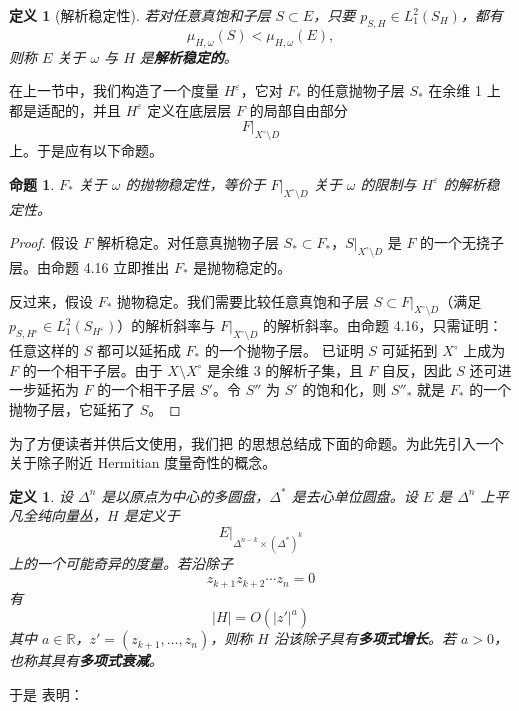 \documentclass[12pt,a4paper]{article}
\newtheorem{proposition}[theorem]{命题}
\newtheorem{definition}[theorem]{定义}
\begin{document}
\begin{definition}[解析稳定性]
若对任意真饱和子层 \(S\subset E\)，只要 \(p_{S,H}\in L_1^2(S_H)\)，都有
\[
\mu_{H,\omega}(S)<\mu_{H,\omega}(E),
\]
则称 \(E\) 关于 \(\omega\) 与 \(H\) 是\textbf{解析稳定的}。
\end{definition}

在上一节中，我们构造了一个度量 \(H^\varepsilon\)，它对 \(F_*\) 的任意抛物子层 \(S_*\) 在余维 1 上都是适配的，并且 \(H^\varepsilon\) 定义在底层层 \(F\) 的局部自由部分
\[
F|_{X^\circ\setminus D}
\]
上。于是应有以下命题。

\begin{proposition}
\(F_*\) 关于 \(\omega\) 的抛物稳定性，等价于 \(F|_{X^\circ\setminus D}\) 关于 \(\omega\) 的限制与 \(H^\varepsilon\) 的解析稳定性。
\end{proposition}

\begin{proof}
假设 \(F\) 解析稳定。对任意真抛物子层 \(S_*\subset F_*\)，\(S|_{X^\circ\setminus D}\) 是 \(F\) 的一个无挠子层。由命题 4.16 立即推出 \(F_*\) 是抛物稳定的。

反过来，假设 \(F_*\) 抛物稳定。我们需要比较任意真饱和子层 \(S\subset F|_{X^\circ\setminus D}\)（满足 \(p_{S,H^\varepsilon}\in L_1^2(S_{H^\varepsilon})\)）的解析斜率与 \(F|_{X^\circ\setminus D}\) 的解析斜率。由命题 4.16，只需证明：任意这样的 \(S\) 都可以延拓成 \(F_*\) 的一个抛物子层。\cite[Proposition 5.9]{Li2000} 已证明 \(S\) 可延拓到 \(X^\circ\) 上成为 \(F\) 的一个相干子层。由于 \(X\setminus X^\circ\) 是余维 3 的解析子集，且 \(F\) 自反，因此 \(S\) 还可进一步延拓为 \(F\) 的一个相干子层 \(S'\)。令 \(S''\) 为 \(S'\) 的饱和化，则 \(S''_*\) 就是 \(F_*\) 的一个抛物子层，它延拓了 \(S\)。
\end{proof}

为了方便读者并供后文使用，我们把 \cite[Proposition 5.9]{Li2000} 的思想总结成下面的命题。为此先引入一个关于除子附近 Hermitian 度量奇性的概念。

\begin{definition}
设 \(\Delta^n\) 是以原点为中心的多圆盘，\(\Delta^*\) 是去心单位圆盘。设 \(E\) 是 \(\Delta^n\) 上平凡全纯向量丛，\(H\) 是定义于
\[
E|_{\Delta^{n-k}\times (\Delta^*)^k}
\]
上的一个可能奇异的度量。若沿除子
\[
z_{k+1}z_{k+2}\cdots z_n=0
\]
有
\[
|H|=O(|z'|^a)
\]
其中 \(a\in\mathbb R\)，\(z'=(z_{k+1},\dots,z_n)\)，则称 \(H\) 沿该除子具有\textbf{多项式增长}。若 \(a>0\)，也称其具有\textbf{多项式衰减}。
\end{definition}

于是 \cite[Proposition 5.9]{Li2000} 表明：
\end{document}
